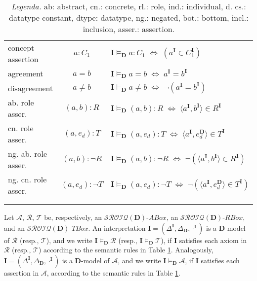 \documentclass[a4paper]{llncs}
\newcommand{\sroiqd}{\ensuremath{\mathcal{SROIQ}(\D)}}
\newcommand{\I}{\mathbf{I}}
\newcommand{\D}{\mathbf{D}}
\begin{document}
{\begin{longtable}{|>{\centering}m{2.5cm}|c|>{\centering\arraybackslash}m{7.5cm}|}
\hline

concept assertion & $a : C_1$ & $\I \models_\D a : C_1 \; \Longleftrightarrow \; (a^\I \in C_1^\I) $ \\

agreement & $a=b$ & $\I \models_\D a=b \; \Longleftrightarrow \; a^\I=b^\I$\\

disagreement & $a \neq b$ & $\I \models_\D a \neq b  \; \Longleftrightarrow \; \neg (a^\I = b^\I)$\\



ab. role asser. & $ (a,b) : R $ & $\I \models_\D (a,b) : R \; \Longleftrightarrow \;  \langle a^\I , b^\I \rangle \in R^\I$ \\

cn. role asser. & $ (a,e_d) : T $ & $\I \models_\D (a,e_d) : T \; \Longleftrightarrow \;   \langle a^\I , e_d^\D \rangle \in T^\I$ \\

ng. ab. role asser. & $ (a,b) : \neg R $ & $\I \models_\D (a,b) : \neg R \; \Longleftrightarrow \;   \neg (\langle a^\I , b^\I \rangle \in R^\I)$ \\

ng. cn. role asser. & $ (a,e_d) : \neg T $ &  $\I \models_\D (a,e_d) : \neg T \; \Longleftrightarrow \;  \neg (\langle a^\I , e_d^\D \rangle \in T^\I)$ \\










\hline \caption{Semantics of \sroiqd.}\\
\caption*{\emph{Legenda.} ab: abstract, cn.: concrete, rl.: role, ind.: individual, d. cs.: datatype constant, dtype: datatype, ng.: negated, bot.: bottom, incl.: inclusion, asser.: assertion.}  \label{semsroiq}
\end{longtable}}







Let $\mathcal{A}$, $\mathcal{R}$, $\mathcal{T}$ be, respectively, an \sroiqd-$ABox$, an \sroiqd-$RBox$, and  an \sroiqd-$TBox$. An interpretation $\I= (\Delta ^ \I, \Delta_{\D}, \cdot ^ \I)$ is a $\D$-model of $\mathcal{R}$ (resp., $\mathcal{T}$), and we write $\I \models_{\D} \mathcal{R}$ (resp., $\I \models_{\D} \mathcal{T}$), if $\I$ satisfies each axiom in $\mathcal{R}$ (resp., $\mathcal{T}$) according to the semantic rules in Table \ref{semsroiq}.  Analogously,  $\I= (\Delta^ \I, \Delta_{\D}, \cdot^\I)$ is a $\D$-model of $\mathcal{A}$, and we write $\I \models_{\D} \mathcal{A}$, if $\I$ satisfies each assertion in $\mathcal{A}$, according to the semantic rules in Table \ref{semsroiq}.
\end{document}
